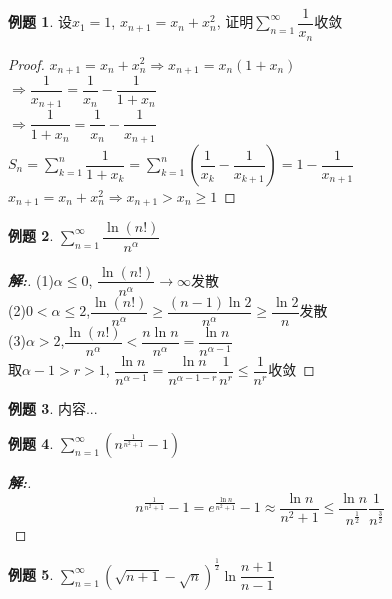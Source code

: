\documentclass[12pt,a4paper]{ctexart}
\newenvironment{solution}{\begin{proof}[\hspace{2em}\textbf{解:}]}{\end{proof}}
\theoremstyle{definition}%
\newtheorem{exercise}{\hspace{2em}例题}
\begin{document}
\begin{exercise}
	设$ x_1=1 $, $ x_{n+1}=x_n+x_n^2 $, 证明$ \displaystyle\sum_{n=1}^{\infty}\dfrac{1}{x_n} $收敛
\end{exercise}
\begin{proof}
	$ x_{n+1}=x_n+x_n^2 \Rightarrow x_{n+1}=x_n(1+x_n) $\\
	
	$ \Rightarrow \dfrac{1}{x_{n+1}}=\dfrac{1}{x_n}-\dfrac{1}{1+x_n} $\\
	
	$ \Rightarrow \dfrac{1}{1+x_n}=\dfrac{1}{x_n}-\dfrac{1}{x_{n+1}} $\\
	
	$ \displaystyle S_n=\sum_{k=1}^{n}\dfrac{1}{1+x_k}
	=\sum_{k=1}^{n}(\dfrac{1}{x_k}-\dfrac{1}{x_{k+1}})
	=1-\dfrac{1}{x_{n+1}} $\\
	
	$ x_{n+1}=x_n+x_n^2 \Rightarrow x_{n+1}>x_n \ge 1 $
\end{proof}
\begin{exercise}
	$ \displaystyle\sum_{n=1}^{\infty}\dfrac{\ln(n!)}{n^\alpha} $
\end{exercise}
\begin{solution}
	(1)$ \alpha \le 0 $, $ \dfrac{\ln(n!)}{n^\alpha} \rightarrow \infty $发散\\
	
	(2)$ 0<\alpha \le 2 $,$ \dfrac{\ln(n!)}{n^\alpha} \ge \dfrac{(n-1)\ln 2}{n^\alpha} \ge \dfrac{\ln 2}{n} $发散\\
	
	(3)$ \alpha>2 $,$ \dfrac{\ln(n!)}{n^\alpha}<\dfrac{n\ln n}{n^\alpha}=\dfrac{\ln n}{n^{\alpha-1}} $\\
	
	取$ \alpha-1>r>1 $, $ \dfrac{\ln n}{n^{\alpha-1}}=\dfrac{\ln n}{n^{\alpha-1-r}}\dfrac{1}{n^r} \le \dfrac{1}{n^r} $收敛
\end{solution}
\begin{exercise}
	内容...
\end{exercise}
\begin{exercise}
	$ \displaystyle\sum_{n=1}^{\infty}\left( n^{\frac{1}{n^2+1}}-1 \right) $
\end{exercise}
\begin{solution}
	$$ \displaystyle n^{\frac{1}{n^2+1}}-1
	=e^{\frac{\ln n}{n^2+1}}-1
	\approx \dfrac{\ln n}{n^2+1}
	\le \dfrac{\ln n}{n^{\frac{1}{2}}}\dfrac{1}{n^{\frac{3}{2}}}$$
\end{solution}
\begin{exercise}
	$ \displaystyle\sum_{n=1}^{\infty} (\sqrt{n+1}-\sqrt{n})^{\frac{1}{2}}\ln\dfrac{n+1}{n-1} $
\end{exercise}
\end{document}
